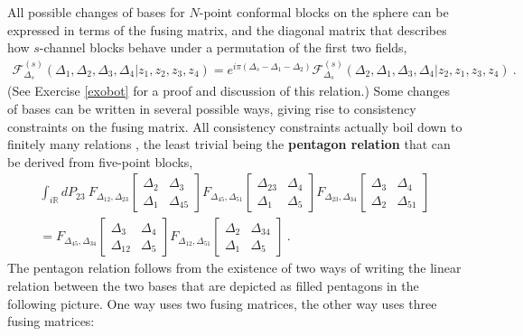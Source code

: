 \documentclass[12pt, a4paper, notitlepage, twoside]{report}
\numberwithin{equation}{section}
\theoremstyle{break}
\begin{document}
All possible changes of bases for $N$-point conformal blocks on the sphere can be expressed in terms of the fusing matrix, and the diagonal matrix that describes how $s$-channel blocks behave under a permutation of the first two fields,
\begin{align}
 \mathcal{F}^{(s)}_{\Delta_s}(\Delta_1,\Delta_2,\Delta_3,\Delta_4|z_1,z_2,z_3,z_4) = e^{i\pi(\Delta_s-\Delta_1-\Delta_2)} \mathcal{F}^{(s)}_{\Delta_s}(\Delta_2,\Delta_1,\Delta_3,\Delta_4|z_2,z_1,z_3,z_4)\ .
 \label{eq:bot}
\end{align}
(See Exercise \ref{exobot} for a proof and discussion of this relation.)
Some changes of bases can be written in several possible ways, giving rise to consistency constraints on the fusing matrix. All consistency constraints actually boil down to finitely many relations \cite{ms89b}, the least trivial being 
the \textbf{pentagon relation} that can be derived from five-point blocks, 
\begin{multline}
 \int_{i\mathbb{R}} dP_{23}\ 
 F_{\Delta_{12},\Delta_{23}}\begin{bmatrix} \Delta_2 & \Delta_3 \\ \Delta_1 & \Delta_{45} \end{bmatrix}
 F_{\Delta_{45},\Delta_{51}}\begin{bmatrix} \Delta_{23} & \Delta_4 \\ \Delta_1 & \Delta_5 \end{bmatrix}
 F_{\Delta_{23},\Delta_{34}}\begin{bmatrix} \Delta_3 & \Delta_4 \\ \Delta_2 & \Delta_{51} \end{bmatrix}
 \\
 = 
 F_{\Delta_{45},\Delta_{34}}\begin{bmatrix} \Delta_3 & \Delta_4 \\ \Delta_{12} & \Delta_5 \end{bmatrix}
 F_{\Delta_{12},\Delta_{51}}\begin{bmatrix} \Delta_2 & \Delta_{34} \\ \Delta_1 & \Delta_5 \end{bmatrix}
 \ .
\end{multline}
The pentagon relation follows from the existence of two ways of writing the linear relation between the two bases that are depicted as filled pentagons in the following picture. One way uses two fusing matrices, the other way uses three fusing matrices:
\end{document}
